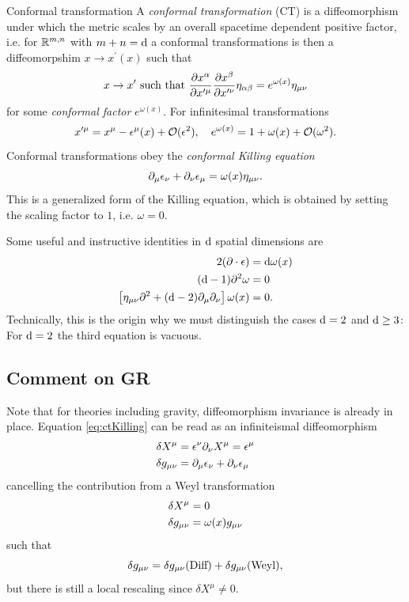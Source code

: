 \begin{mybox}{Conformal transformation}
	A \emph{conformal transformation} (CT) is a diffeomorphism under which the metric scales by an overall spacetime dependent positive factor,
i.e. for $\mathbb{R}^{m,n}$ with $m+n=\mathrm{d}$ a conformal transformations is then a diffeomorpshim $x\rightarrow x^\prime(x)$ such that
	\begin{equation}
	\label{eq:ctFull}
		x \rightarrow x^\prime \text{ such that } \frac{\partial x^\alpha}{\partial x^{\prime \mu}} \frac{\partial x^\beta}{\partial x^{\prime \nu}} \eta_{\alpha \beta} = e^{\omega(x)} \eta_{\mu \nu} 
	\end{equation}
	for some \emph{conformal factor} $e^{\omega(x)}$.  For infinitesimal transformations
	\begin{equation}
	\label{eq:ctInfinitesimal}
		x^{\prime \mu} = x^\mu - \epsilon^\mu (x) + \mathcal{O}(\epsilon^2), \quad e^{\omega(x)} = 1 + \omega(x) + \mathcal{O}(\omega^2).
	\end{equation}
	Conformal transformations obey the \emph{conformal Killing equation}
	\begin{equation}
		\label{eq:ctKilling}
		\partial_\mu \epsilon_\nu + \partial_\nu \epsilon_\mu = \omega(x) \eta_{\mu \nu}.
	\end{equation}
	This is a generalized form of the Killing equation, which is obtained by setting the scaling factor to $1$, i.e. $\omega=0$.
\end{mybox}
Some useful and instructive identities in $\mathrm{d}$ spatial dimensions are
\begin{align}
	\label{eq:ctConstraints}
	2 (\partial \cdot \epsilon) & = \mathrm{d} \omega(x) \nonumber \\
	(\mathrm{d}-1)\partial^2 \omega &= 0 \nonumber \\
	\left[\eta_{\mu \nu} \partial^2+(\mathrm{d}-2) \partial_\mu \partial_\nu \right] \omega(x) &= 0.
\end{align}
Technically, this is the origin why we must distinguish the cases $\mathrm{d}=2$ and $\mathrm{d}\geq 3$: \\
For $\mathrm{d}=2$ the third equation is vacuous.
\subsection{Comment on GR }
Note that for theories including gravity, diffeomorphism invariance is already in place. Equation \ref{eq:ctKilling} can be read as an infiniteismal diffeomorphism
\begin{align}
	\delta X^\mu &= \epsilon^\nu \partial_\nu X^\mu = \epsilon^\mu \\
	\delta g_{\mu \nu} &= \partial_\mu \epsilon_\nu + \partial_\nu \epsilon_\mu
\end{align}
cancelling the contribution from a Weyl transformation
\begin{align}
	\delta X^\mu &=0 \\
	\delta g_{\mu \nu} &= \omega(x) g_{\mu \nu} 
\end{align}
such that 
\begin{equation*}
	\delta g_{\mu \nu} = \delta g_{\mu \nu}(\text{Diff}) + \delta g_{\mu \nu}(\text{Weyl}),
\end{equation*}
but there is still a local rescaling since $\delta X^\mu \neq 0$.

